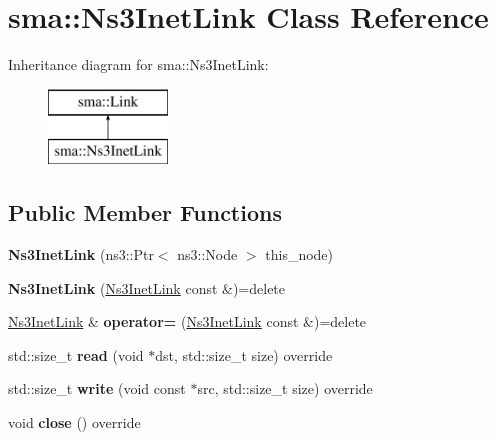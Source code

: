 \hypertarget{classsma_1_1Ns3InetLink}{\section{sma\-:\-:Ns3\-Inet\-Link Class Reference}
\label{classsma_1_1Ns3InetLink}
}
Inheritance diagram for sma\-:\-:Ns3\-Inet\-Link\-:\begin{figure}[H]
\begin{center}
\leavevmode
\includegraphics[height=2.000000cm]{classsma_1_1Ns3InetLink}
\end{center}
\end{figure}
\subsection*{Public Member Functions}
\begin{DoxyCompactItemize}
\item 
\hypertarget{classsma_1_1Ns3InetLink_af2c974c49f521b18f241f6757ff8c0df}{{\bfseries Ns3\-Inet\-Link} (ns3\-::\-Ptr$<$ ns3\-::\-Node $>$ this\-\_\-node)}\label{classsma_1_1Ns3InetLink_af2c974c49f521b18f241f6757ff8c0df}

\item 
\hypertarget{classsma_1_1Ns3InetLink_aa7c5f097857d2bcdb8e7ca0618922413}{{\bfseries Ns3\-Inet\-Link} (\hyperlink{classsma_1_1Ns3InetLink}{Ns3\-Inet\-Link} const \&)=delete}\label{classsma_1_1Ns3InetLink_aa7c5f097857d2bcdb8e7ca0618922413}

\item 
\hypertarget{classsma_1_1Ns3InetLink_a6853c05d4cf43277fd252d737de4db47}{\hyperlink{classsma_1_1Ns3InetLink}{Ns3\-Inet\-Link} \& {\bfseries operator=} (\hyperlink{classsma_1_1Ns3InetLink}{Ns3\-Inet\-Link} const \&)=delete}\label{classsma_1_1Ns3InetLink_a6853c05d4cf43277fd252d737de4db47}

\item 
\hypertarget{classsma_1_1Ns3InetLink_aa715856ee5898ad647f3ba459854a7dc}{std\-::size\-\_\-t {\bfseries read} (void $\ast$dst, std\-::size\-\_\-t size) override}\label{classsma_1_1Ns3InetLink_aa715856ee5898ad647f3ba459854a7dc}

\item 
\hypertarget{classsma_1_1Ns3InetLink_a1ccd46880c20145a96639f76c1172ec7}{std\-::size\-\_\-t {\bfseries write} (void const $\ast$src, std\-::size\-\_\-t size) override}\label{classsma_1_1Ns3InetLink_a1ccd46880c20145a96639f76c1172ec7}

\item 
\hypertarget{classsma_1_1Ns3InetLink_ace9d75ecd205a9ebf166c30538b600f3}{void {\bfseries close} () override}\label{classsma_1_1Ns3InetLink_ace9d75ecd205a9ebf166c30538b600f3}

\end{DoxyCompactItemize}
